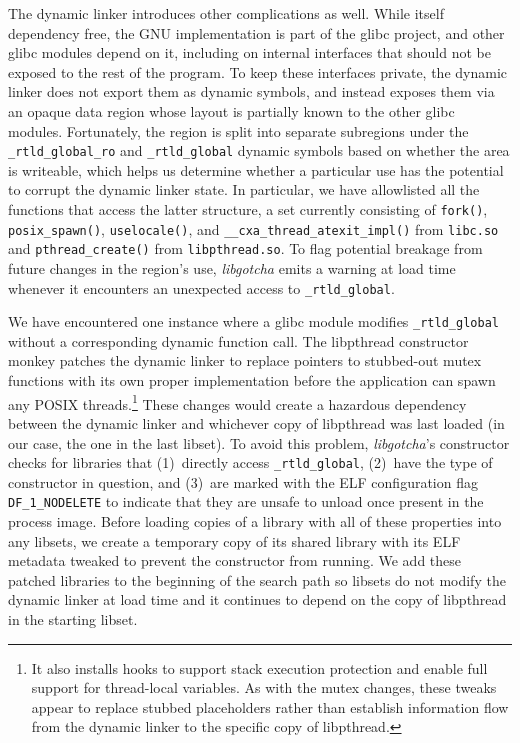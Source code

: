 The dynamic linker introduces other complications as well.  While itself dependency
free, the GNU implementation is part of the glibc project, and other glibc modules
depend on it, including on internal interfaces that should not be exposed to the rest
of the program.  To keep these interfaces private, the dynamic linker does not export
them as dynamic symbols, and instead exposes them via an opaque data region whose
layout is partially known to the other glibc modules.  Fortunately, the region is
split into separate subregions under the \texttt{\_rtld\_global\_ro} and
\texttt{\_rtld\_global} dynamic symbols based on whether the area is writeable, which
helps us determine whether a particular use has the potential to corrupt the dynamic
linker state.  In particular, we have allowlisted all the functions that access the
latter structure, a set currently consisting of \texttt{fork()},
\texttt{posix\_spawn()}, \texttt{uselocale()}, and
\texttt{\_\_cxa\_thread\_atexit\_impl()} from \texttt{libc.so} and
\texttt{pthread\_create()} from \texttt{libpthread.so}.  To flag potential breakage
from future changes in the region's use, \textit{libgotcha} emits a warning at load
time whenever it encounters an unexpected access to \texttt{\_rtld\_global}.

We have encountered one instance where a glibc module modifies
\texttt{\_rtld\_global} without a corresponding dynamic function call.  The
libpthread constructor monkey patches the dynamic linker to replace pointers to
stubbed-out mutex functions with its own proper implementation before the application
can spawn any POSIX threads.\footnote{It also installs hooks to support stack
execution protection and enable full support for thread-local variables.  As with the
mutex changes, these tweaks appear to replace stubbed placeholders rather than
establish information flow from the dynamic linker to the specific copy of
libpthread.}  These changes would create a hazardous dependency between the dynamic
linker and whichever copy of libpthread was last loaded (in our case, the one in the
last libset).  To avoid this problem, \textit{libgotcha}'s constructor checks for
libraries that (1)~directly access \texttt{\_rtld\_global}, (2)~have the type of
constructor in question, and (3)~are marked with the ELF configuration flag
\texttt{DF\_1\_NODELETE} to indicate that they are unsafe to unload once present in
the process image.  Before loading copies of a library with all of these properties
into any libsets, we create a temporary copy of its shared library with its ELF
metadata tweaked to prevent the constructor from running.  We add these patched
libraries to the beginning of the search path so libsets do not modify the dynamic
linker at load time and it continues to depend on the copy of libpthread in the
starting libset.

